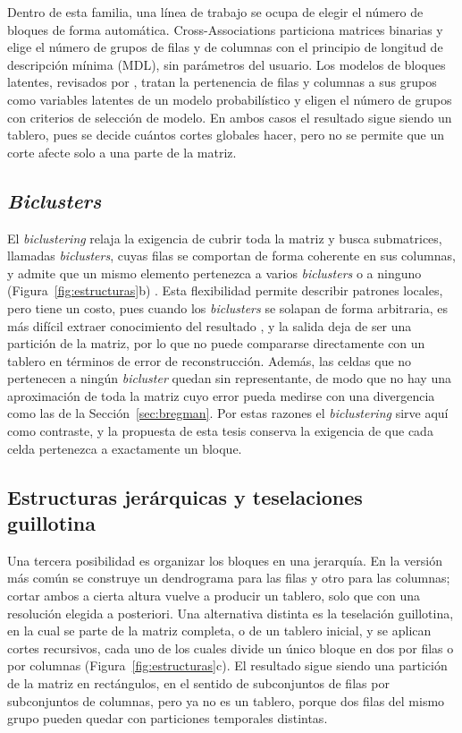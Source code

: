 Dentro de esta familia, una línea de trabajo se ocupa de elegir el número de
bloques de forma automática. Cross-Associations \citep{Chakrabarti2004} particiona
matrices binarias y elige el número de grupos de filas y de columnas con el
principio de longitud de descripción mínima (MDL), sin parámetros del usuario. Los
modelos de bloques latentes, revisados por \citet{Biernacki2023}, tratan la
pertenencia de filas y columnas a sus grupos como variables latentes de un modelo
probabilístico y eligen el número de grupos con criterios de selección de modelo.
En ambos casos el resultado sigue siendo un tablero, pues se decide cuántos
cortes globales hacer, pero no se permite que un corte afecte solo a una parte de
la matriz.

\subsection{\emph{Biclusters}}

El \emph{biclustering} relaja la exigencia de cubrir toda la matriz y busca submatrices,
llamadas \emph{biclusters}, cuyas filas se comportan de forma coherente en sus columnas,
y admite que un mismo elemento pertenezca a varios \emph{biclusters} o a ninguno
(Figura~\ref{fig:estructuras}b) \citep{Castanho2024}. Esta flexibilidad permite
describir patrones locales, pero tiene un costo, pues cuando los \emph{biclusters} se solapan
de forma arbitraria, es más difícil extraer conocimiento del resultado
\citep{Castanho2024}, y la salida deja de ser una partición de la matriz, por lo
que no puede compararse directamente con un tablero en términos de error de
reconstrucción. Además, las celdas que no pertenecen a ningún \emph{bicluster}
quedan sin representante, de modo que no hay una aproximación de toda la matriz
cuyo error pueda medirse con una divergencia como las de la
Sección~\ref{sec:bregman}. Por estas razones el \emph{biclustering} sirve aquí
como contraste, y la propuesta de esta tesis conserva la exigencia de que cada
celda pertenezca a exactamente un bloque.

\subsection{Estructuras jerárquicas y teselaciones guillotina}

Una tercera posibilidad es organizar los bloques en una jerarquía. En la versión
más común se construye un dendrograma para las filas y otro para las columnas;
cortar ambos a cierta altura vuelve a producir un tablero, solo que con una
resolución elegida a posteriori. Una alternativa distinta es la teselación
guillotina, en la cual se parte de la matriz completa, o de un tablero inicial, y se aplican
cortes recursivos, cada uno de los cuales divide un único bloque en dos por filas
o por columnas (Figura~\ref{fig:estructuras}c). El resultado sigue siendo una
partición de la matriz en rectángulos, en el sentido de subconjuntos de filas por
subconjuntos de columnas, pero ya no es un tablero, porque dos filas del mismo
grupo pueden quedar con particiones temporales distintas.

